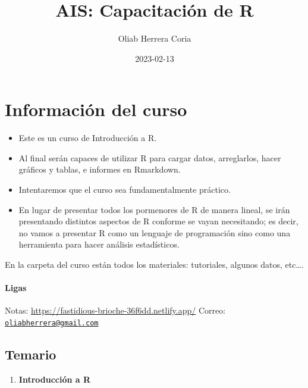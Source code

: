 \documentclass[
]{book}
\title{AIS: Capacitación de R}
\author{Oliab Herrera Coria}
\date{2023-02-13}
\providecommand{\tightlist}{%
  \setlength{\itemsep}{0pt}\setlength{\parskip}{0pt}}
\begin{document}
\maketitle

{
\setcounter{tocdepth}{1}
\tableofcontents
}
\hypertarget{informaciuxf3n-del-curso}{%
\chapter*{Información del curso}\label{informaciuxf3n-del-curso}}

\begin{itemize}
\item
  Este es un curso de Introducción a R.
\item
  Al final serán capaces de utilizar R para cargar datos, arreglarlos, hacer gráficos y tablas, e informes en Rmarkdown.
\item
  Intentaremos que el curso sea fundamentalmente práctico.
\item
  En lugar de presentar todos los pormenores de R de manera lineal, se irán presentando distintos aspectos de R conforme se vayan necesitando; es decir, no vamos a presentar R como un lenguaje de programación sino como una herramienta para hacer análisis estadísticos.
\end{itemize}

En la carpeta del curso están todos los materiales: tutoriales, algunos datos, etc\ldots.

\hypertarget{ligas}{%
\subsubsection*{Ligas}\label{ligas}}

Notas: \url{https://fastidious-brioche-36f6dd.netlify.app/}
Correo: \href{mailto:oliabherrera@gmail.com}{\nolinkurl{oliabherrera@gmail.com}}

\hypertarget{temario}{%
\section*{Temario}\label{temario}}

\begin{enumerate}
\def\labelenumi{\arabic{enumi}.}
\tightlist
\item
  \textbf{Introducción a R}
\end{enumerate}
\end{document}
